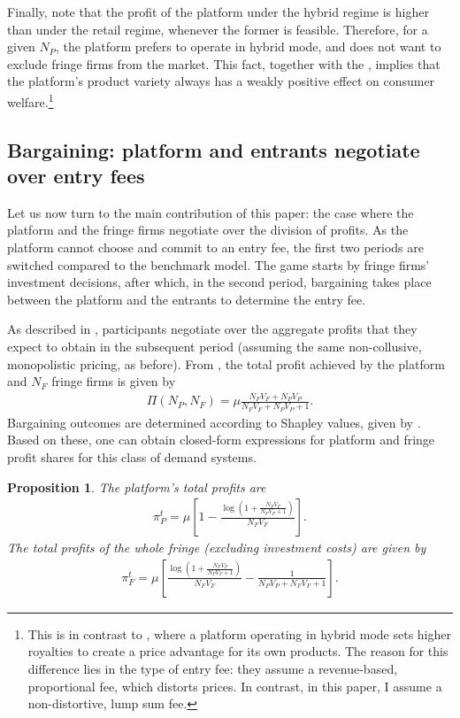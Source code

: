 \documentclass[a4paper]{article}
\newtheorem{proposition}{Proposition}
\begin{document}
Finally, note that the profit of the platform under the hybrid regime is higher than under the retail regime, whenever the former is feasible.
Therefore, for a given $N_P$, the platform prefers to operate in hybrid mode, and does not want to exclude fringe firms from the market.
This fact, together with the , implies that the platform's product variety always has a weakly positive effect on consumer welfare.\footnote{
    This is in contrast to \textcite{anderson2021hybrid}, where a platform operating in hybrid mode sets higher royalties to create a price advantage for its own products.
    The reason for this difference lies in the type of entry fee: they assume a revenue-based, proportional fee, which distorts prices.
    In contrast, in this paper, I assume a non-distortive, lump sum fee.
}

\subsection{Bargaining: platform and entrants negotiate over entry fees}

Let us now turn to the main contribution of this paper: the case where the platform and the fringe firms negotiate over the division of profits.
As the platform cannot choose and commit to an entry fee, the first two periods are switched compared to the benchmark model.
The game starts by fringe firms' investment decisions, after which, in the second period, bargaining takes place between the platform and the entrants to determine the entry fee.

As described in , participants negotiate over the aggregate profits that they expect to obtain in the subsequent period (assuming the same non-collusive, monopolistic pricing, as before).
From , the total profit achieved by the platform and $N_F$ fringe firms is given by
\begin{align}
    \Pi(N_P, N_F) = \mu \frac{N_F V_F + N_P V_P}{N_F V_F + N_P V_P + 1}.  \label{eq:total_profits}
\end{align}
Bargaining outcomes are determined according to Shapley values, given by .
Based on these, one can obtain closed-form expressions for platform and fringe profit shares for this class of demand systems.
\begin{proposition}
    \label{prop:platform_profits_bargaining}
    The platform's total profits are
    \begin{align*}
        \pi^t_P = \mu \left[ 1 - \frac{\log \left(1 + \frac{N_F V_F}{N_P V_P + 1} \right)}{N_F V_F} \right].
    \end{align*}
    The total profits of the whole fringe (excluding investment costs) are given by
    \begin{align*}
        \pi^t_F = \mu \left[ \frac{\log \left( 1 + \frac{N_F V_F}{N_P V_P + 1} \right)}{N_F V_F} - \frac{1}{N_P V_P + N_F V_F + 1} \right].
    \end{align*}
\end{proposition}
\end{document}
